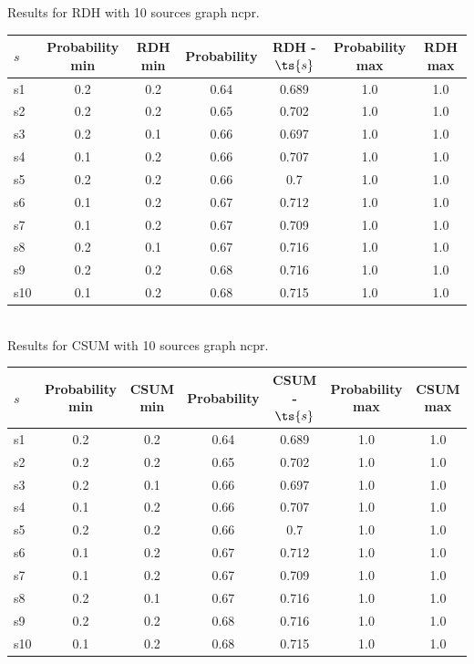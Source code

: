 \documentclass{article}
\begin{document}
\noindent Results for RDH with 10 sources graph ncpr.

\noindent\begin{tabular}{|l|c|c|c|c|c|c|}
\hline
$s$& Probability min & RDH min & Probability & RDH - $\ts{s}$ & Probability max & RDH max\\
\hline
s1 &0.2 & 0.2 & 0.64 & 0.689 & 1.0 & 1.0\\
\hline
s2 &0.2 & 0.2 & 0.65 & 0.702 & 1.0 & 1.0\\
\hline
s3 &0.2 & 0.1 & 0.66 & 0.697 & 1.0 & 1.0\\
\hline
s4 &0.1 & 0.2 & 0.66 & 0.707 & 1.0 & 1.0\\
\hline
s5 &0.2 & 0.2 & 0.66 & 0.7 & 1.0 & 1.0\\
\hline
s6 &0.1 & 0.2 & 0.67 & 0.712 & 1.0 & 1.0\\
\hline
s7 &0.1 & 0.2 & 0.67 & 0.709 & 1.0 & 1.0\\
\hline
s8 &0.2 & 0.1 & 0.67 & 0.716 & 1.0 & 1.0\\
\hline
s9 &0.2 & 0.2 & 0.68 & 0.716 & 1.0 & 1.0\\
\hline
s10 &0.1 & 0.2 & 0.68 & 0.715 & 1.0 & 1.0\\
\hline
\end{tabular}\\

\noindent Results for CSUM with 10 sources graph ncpr.

\noindent\begin{tabular}{|l|c|c|c|c|c|c|}
\hline
$s$& Probability min & CSUM min & Probability & CSUM - $\ts{s}$ & Probability max & CSUM max\\
\hline
s1 &0.2 & 0.2 & 0.64 & 0.689 & 1.0 & 1.0\\
\hline
s2 &0.2 & 0.2 & 0.65 & 0.702 & 1.0 & 1.0\\
\hline
s3 &0.2 & 0.1 & 0.66 & 0.697 & 1.0 & 1.0\\
\hline
s4 &0.1 & 0.2 & 0.66 & 0.707 & 1.0 & 1.0\\
\hline
s5 &0.2 & 0.2 & 0.66 & 0.7 & 1.0 & 1.0\\
\hline
s6 &0.1 & 0.2 & 0.67 & 0.712 & 1.0 & 1.0\\
\hline
s7 &0.1 & 0.2 & 0.67 & 0.709 & 1.0 & 1.0\\
\hline
s8 &0.2 & 0.1 & 0.67 & 0.716 & 1.0 & 1.0\\
\hline
s9 &0.2 & 0.2 & 0.68 & 0.716 & 1.0 & 1.0\\
\hline
s10 &0.1 & 0.2 & 0.68 & 0.715 & 1.0 & 1.0\\
\hline
\end{tabular}\\
\end{document}
